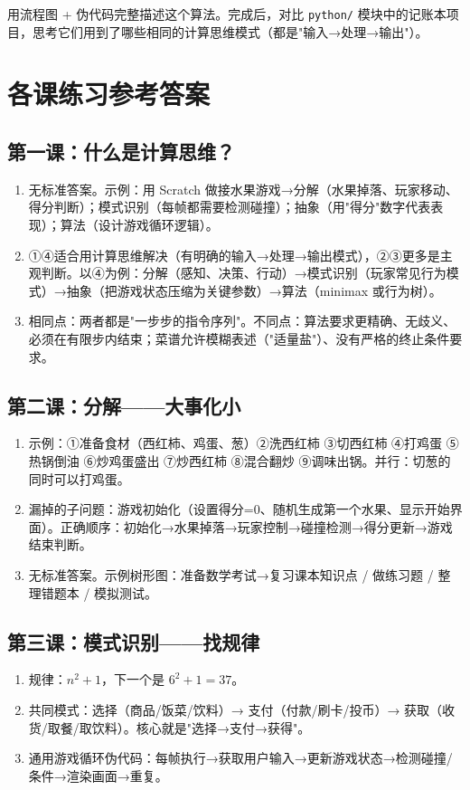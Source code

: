 \documentclass[a4paper,12pt]{ctexart}
\begin{document}
用流程图 + 伪代码完整描述这个算法。完成后，对比 \texttt{python/} 模块中的记账本项目，思考它们用到了哪些相同的计算思维模式（都是"输入→处理→输出"）。

\section*{\textcolor{blue!70!black}{各课练习参考答案}}

\subsection*{第一课：什么是计算思维？}
\begin{enumerate}
  \item 无标准答案。示例：用 Scratch 做接水果游戏→分解（水果掉落、玩家移动、得分判断）；模式识别（每帧都需要检测碰撞）；抽象（用"得分"数字代表表现）；算法（设计游戏循环逻辑）。
  \item ①④适合用计算思维解决（有明确的输入→处理→输出模式），②③更多是主观判断。以④为例：分解（感知、决策、行动）→模式识别（玩家常见行为模式）→抽象（把游戏状态压缩为关键参数）→算法（minimax 或行为树）。
  \item 相同点：两者都是"一步步的指令序列"。不同点：算法要求更精确、无歧义、必须在有限步内结束；菜谱允许模糊表述（"适量盐"）、没有严格的终止条件要求。
\end{enumerate}

\subsection*{第二课：分解——大事化小}
\begin{enumerate}
  \item 示例：①准备食材（西红柿、鸡蛋、葱）②洗西红柿 ③切西红柿 ④打鸡蛋 ⑤热锅倒油 ⑥炒鸡蛋盛出 ⑦炒西红柿 ⑧混合翻炒 ⑨调味出锅。并行：切葱的同时可以打鸡蛋。
  \item 漏掉的子问题：游戏初始化（设置得分=0、随机生成第一个水果、显示开始界面）。正确顺序：初始化→水果掉落→玩家控制→碰撞检测→得分更新→游戏结束判断。
  \item 无标准答案。示例树形图：准备数学考试→复习课本知识点 / 做练习题 / 整理错题本 / 模拟测试。
\end{enumerate}

\subsection*{第三课：模式识别——找规律}
\begin{enumerate}
  \item 规律：$n^2 + 1$，下一个是 $6^2 + 1 = 37$。
  \item 共同模式：选择（商品/饭菜/饮料）→ 支付（付款/刷卡/投币）→ 获取（收货/取餐/取饮料）。核心就是"选择→支付→获得"。
  \item 通用游戏循环伪代码：每帧执行→获取用户输入→更新游戏状态→检测碰撞/条件→渲染画面→重复。
\end{enumerate}
\end{document}
